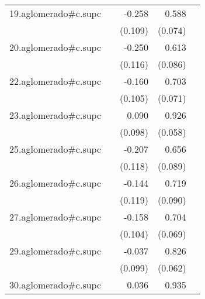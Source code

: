 {\begin{longtable}{l*{4}{D{.}{.}{-1}}}
\addlinespace
19.aglomerado#c.supc&                     &      -0.258\sym{*}  &       0.588\sym{***}&                     \\
            &                     &     (0.109)         &     (0.074)         &                     \\
\addlinespace
20.aglomerado#c.supc&                     &      -0.250\sym{*}  &       0.613\sym{***}&                     \\
            &                     &     (0.116)         &     (0.086)         &                     \\
\addlinespace
22.aglomerado#c.supc&                     &      -0.160         &       0.703\sym{***}&                     \\
            &                     &     (0.105)         &     (0.071)         &                     \\
\addlinespace
23.aglomerado#c.supc&                     &       0.090         &       0.926\sym{***}&                     \\
            &                     &     (0.098)         &     (0.058)         &                     \\
\addlinespace
25.aglomerado#c.supc&                     &      -0.207         &       0.656\sym{***}&                     \\
            &                     &     (0.118)         &     (0.089)         &                     \\
\addlinespace
26.aglomerado#c.supc&                     &      -0.144         &       0.719\sym{***}&                     \\
            &                     &     (0.119)         &     (0.090)         &                     \\
\addlinespace
27.aglomerado#c.supc&                     &      -0.158         &       0.704\sym{***}&                     \\
            &                     &     (0.104)         &     (0.069)         &                     \\
\addlinespace
29.aglomerado#c.supc&                     &      -0.037         &       0.826\sym{***}&                     \\
            &                     &     (0.099)         &     (0.062)         &                     \\
\addlinespace
30.aglomerado#c.supc&                     &       0.036         &       0.935\sym{***}&                     \\

\end{longtable}}
